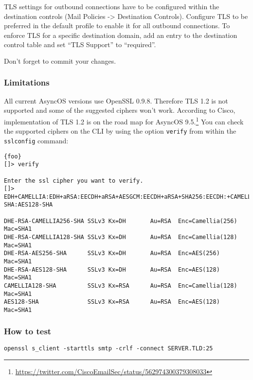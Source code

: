 TLS settings for outbound connections have to be configured within the destination controls (Mail Policies -> Destination Controls). Configure TLS to be preferred in the default profile to enable it for all outbound connections. To enforce TLS for a specific destination domain, add an entry to the destination control table and set ``TLS Support'' to ``required''.

Don't forget to commit your changes.

\subsubsection{Limitations}
All current AsyncOS versions use OpenSSL 0.9.8. Therefore TLS 1.2 is not supported and some of the suggested ciphers won't work. According to Cisco, implementation of TLS 1.2 is on the road map for AsyncOS 9.5.\footnote{\url{https://twitter.com/CiscoEmailSec/status/562974300379308033}} You can check the supported ciphers on the CLI by using the option \texttt{verify} from within the \texttt{sslconfig} command:
\begin{lstlisting}{foo}
[]> verify

Enter the ssl cipher you want to verify.
[]> EDH+CAMELLIA:EDH+aRSA:EECDH+aRSA+AESGCM:EECDH+aRSA+SHA256:EECDH:+CAMELLIA128:+AES128:+SSLv3:!aNULL:!eNULL:!LOW:!3DES:!MD5:!EXP:!PSK:!DSS:!RC4:!SEED:!IDEA:!ECDSA:kEDH:CAMELLIA128-SHA:AES128-SHA

DHE-RSA-CAMELLIA256-SHA SSLv3 Kx=DH       Au=RSA  Enc=Camellia(256) Mac=SHA1
DHE-RSA-CAMELLIA128-SHA SSLv3 Kx=DH       Au=RSA  Enc=Camellia(128) Mac=SHA1
DHE-RSA-AES256-SHA      SSLv3 Kx=DH       Au=RSA  Enc=AES(256)  Mac=SHA1
DHE-RSA-AES128-SHA      SSLv3 Kx=DH       Au=RSA  Enc=AES(128)  Mac=SHA1
CAMELLIA128-SHA         SSLv3 Kx=RSA      Au=RSA  Enc=Camellia(128) Mac=SHA1
AES128-SHA              SSLv3 Kx=RSA      Au=RSA  Enc=AES(128)  Mac=SHA1
\end{lstlisting}

\subsubsection{How to test}
\begin{lstlisting}
openssl s_client -starttls smtp -crlf -connect SERVER.TLD:25
\end{lstlisting}
